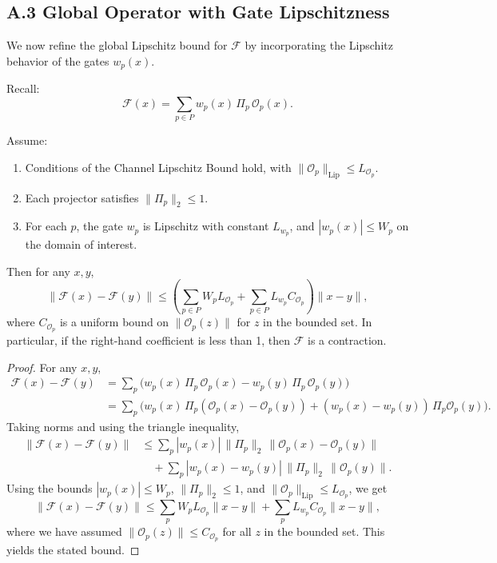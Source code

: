\documentclass[11pt]{article}
\begin{document}
\subsection*{A.3 Global Operator with Gate Lipschitzness}

We now refine the global Lipschitz bound for \(\mathcal{F}\) by incorporating the Lipschitz behavior of the gates \(w_p(x)\).

Recall:
\[
  \mathcal{F}(x) = \sum_{p \in P} w_p(x)\,\Pi_p\,\mathcal{O}_p(x).
\]

\begin{theorem}
Assume:
\begin{enumerate}[label=(\roman*),leftmargin=*]
  \item Conditions of the Channel Lipschitz Bound hold, with
        \(\|\mathcal{O}_p\|_{\mathrm{Lip}} \leq L_{\mathcal{O}_p}\).
  \item Each projector satisfies \(\|\Pi_p\|_2 \leq 1\).
  \item For each \(p\), the gate \(w_p\) is Lipschitz with constant \(L_{w_p}\), and
        \(|w_p(x)| \leq W_p\) on the domain of interest.
\end{enumerate}
Then for any \(x,y\),
\[
  \|\mathcal{F}(x) - \mathcal{F}(y)\|
  \leq
  \left(
    \sum_{p \in P} W_p L_{\mathcal{O}_p}
    + \sum_{p \in P} L_{w_p} C_{\mathcal{O}_p}
  \right)
  \|x-y\|,
\]
where \(C_{\mathcal{O}_p}\) is a uniform bound on \(\|\mathcal{O}_p(z)\|\) for \(z\) in the bounded set.
In particular, if the right-hand coefficient is less than 1, then \(\mathcal{F}\) is a contraction.
\end{theorem}

\begin{proof}
For any \(x,y\),
\begin{align*}
  \mathcal{F}(x) - \mathcal{F}(y)
  &= \sum_{p}
     \Big(
       w_p(x)\,\Pi_p\,\mathcal{O}_p(x)
       - w_p(y)\,\Pi_p\,\mathcal{O}_p(y)
     \Big) \\
  &= \sum_{p}
     \Big(
       w_p(x)\,\Pi_p(\mathcal{O}_p(x) - \mathcal{O}_p(y))
       + (w_p(x)-w_p(y))\,\Pi_p \mathcal{O}_p(y)
     \Big).
\end{align*}
Taking norms and using the triangle inequality,
\begin{align*}
  \|\mathcal{F}(x) - \mathcal{F}(y)\|
  &\leq \sum_p
    |w_p(x)|\,\|\Pi_p\|_2\,\|\mathcal{O}_p(x) - \mathcal{O}_p(y)\| \\
  &\quad
    + \sum_p
    |w_p(x) - w_p(y)|\,\|\Pi_p\|_2\,\|\mathcal{O}_p(y)\|.
\end{align*}
Using the bounds \(|w_p(x)| \leq W_p\), \(\|\Pi_p\|_2 \leq 1\), and \(\|\mathcal{O}_p\|_{\mathrm{Lip}} \leq L_{\mathcal{O}_p}\), we get
\[
  \|\mathcal{F}(x) - \mathcal{F}(y)\|
  \leq
  \sum_p W_p L_{\mathcal{O}_p} \|x-y\|
  + \sum_p L_{w_p} C_{\mathcal{O}_p} \|x-y\|,
\]
where we have assumed \(\|\mathcal{O}_p(z)\| \leq C_{\mathcal{O}_p}\) for all \(z\) in the bounded set.
This yields the stated bound.
\end{proof}
\end{document}
